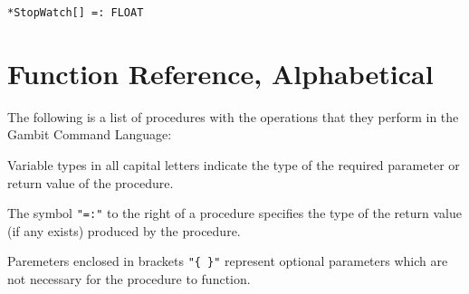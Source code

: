 \protect \large \begin{verbatim}
*StopWatch[] =: FLOAT
\end{verbatim}\normalsize


\section{Function Reference, Alphabetical}

The following is a list of procedures with the operations that they
perform in the Gambit Command Language:

Variable types in all capital letters indicate the type of the
required parameter or return value of the procedure.

The symbol {\tt "=:"} to the right of a procedure specifies the type
of the return value (if any exists) produced by the procedure.

Paremeters enclosed in brackets {\tt "\{ \}"} represent optional
parameters which are not necessary for the procedure to function.

